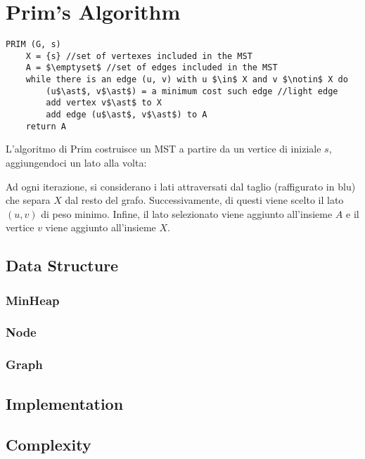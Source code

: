 \section{Prim's Algorithm}\label{prim}

\begin{lstlisting}[mathescape=true]
PRIM (G, s)
	X = {s} //set of vertexes included in the MST
	A = $\emptyset$ //set of edges included in the MST
	while there is an edge (u, v) with u $\in$ X and v $\notin$ X do
		(u$\ast$, v$\ast$) = a minimum cost such edge //light edge
		add vertex v$\ast$ to X
		add edge (u$\ast$, v$\ast$) to A
	return A	

\end{lstlisting}

L'algoritmo di Prim costruisce un MST a partire da un vertice di iniziale $s$, aggiungendoci un lato alla volta:



Ad ogni iterazione, si considerano i lati attraversati dal taglio (raffigurato in blu) che separa $X$ dal resto del grafo. 
Successivamente, di questi viene scelto il lato $(u, v)$ di peso minimo. 
Infine, il lato selezionato viene aggiunto all'insieme $A$ e il vertice $v$ viene aggiunto all'insieme $X$.

\subsection{Data Structure}
	
	\subsubsection{MinHeap}
				
	\subsubsection{Node}
		
	\subsubsection{Graph}
		

\subsection{Implementation}

\subsection{Complexity}

	
\pagebreak